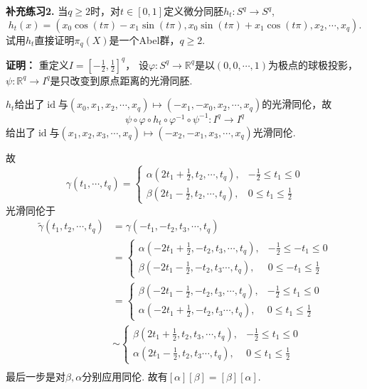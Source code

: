 \textbf{补充练习2.} 当$q\geq 2$时，对$t\in [0,1]$定义微分同胚$h_t:S^q\rightarrow S^q$,
        $$h_t(x)=(x_0\cos(t\pi)-x_1\sin(t\pi), x_0\sin(t\pi)+x_1\cos(t\pi),x_2,\cdots,x_q).$$
试用$h_t$直接证明$\pi_q(X)$是一个Abel群，$q\geq 2$.\par
\textbf{证明：}
    重定义$I=[-\frac{1}{2},\frac{1}{2}]^q$，
    设$\varphi:S^q\rightarrow \mathbb{R}^q$是以$(0,0,\cdots,1)$为极点的球极投影，
    $\psi:\mathbb{R}^q\rightarrow I^q$是只改变到原点距离的光滑同胚.\par
    \qquad $h_t$给出了$\operatorname{id}$与$(x_0,x_1,x_2,\cdots,x_q)
    \mapsto (-x_1,-x_0,x_2,\cdots,x_q)$的光滑同伦，故
    \[\psi\circ \varphi \circ h_t \circ \varphi^{-1} \circ \psi^{-1}: I^q\rightarrow I^q\]
    给出了$\operatorname{id}$与$(x_1,x_2,x_3, \cdots,x_q)\mapsto (-x_2,-x_1,x_3, \cdots, x_q)$光滑同伦.\par
    \qquad 故
    $$\gamma(t_1,\cdots,t_q)=\begin{cases} \alpha(2t_1+\frac{1}{2},t_2,\cdots,t_q), &-\frac{1}{2}\leq t_1\leq 0\\
            \beta(2t_1-\frac{1}{2},t_2,\cdots,t_q), &0\leq t_1\leq \frac{1}{2}\end{cases}$$
        光滑同伦于
            \begin{align*}
                \tilde{\gamma}(t_1,t_2,\cdots,t_q)&=\gamma(-t_1,-t_2,t_3,\cdots,t_q)\\
                &=\begin{cases} \alpha(-2t_1+\frac{1}{2},-t_2,t_3,\cdots,t_q), &-\frac{1}{2}\leq -t_1\leq 0\\
                    \beta(-2t_1-\frac{1}{2},-t_2,t_3\cdots,t_q), &0\leq -t_1\leq \frac{1}{2}\end{cases}\\
                &=\begin{cases} \beta(-2t_1-\frac{1}{2},-t_2,t_3,\cdots,t_q), &-\frac{1}{2}\leq t_1\leq 0\\
                    \alpha(-2t_1+\frac{1}{2},-t_2,t_3\cdots,t_q), &0\leq t_1\leq \frac{1}{2}\end{cases}\\
                &\sim \begin{cases} \beta(2t_1+\frac{1}{2},t_2,t_3,\cdots,t_q), &-\frac{1}{2}\leq t_1\leq 0\\
                    \alpha(2t_1-\frac{1}{2},t_2,t_3\cdots,t_q), &0\leq t_1\leq \frac{1}{2}\end{cases}\\
            \end{align*}
        最后一步是对$\beta,\alpha$分别应用同伦. 故有$[\alpha][\beta]=[\beta][\alpha]$.
